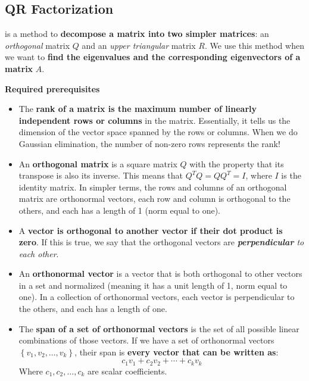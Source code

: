 \subsection{QR Factorization}

 is a method to \textbf{decompose a matrix into two simpler matrices}: an \emph{orthogonal} matrix $Q$ and an \emph{upper triangular} matrix $R$. We use this method when we want to \textbf{find the eigenvalues and the corresponding eigenvectors of a matrix} $A$.

\begin{flushleft}
    \textcolor{Red2}{ \textbf{Required prerequisites}}
\end{flushleft}
\begin{itemize}
    \item The \textbf{rank of a matrix is the maximum number of linearly independent rows or columns} in the matrix. Essentially, it tells us the dimension of the vector space spanned by the rows or columns. When we do Gaussian elimination, the number of non-zero rows represents the rank!
    
    \item An \textbf{orthogonal matrix} is a square matrix $Q$ with the property that its transpose is also its inverse. This means that $Q^{T} Q = Q Q^{T} = I$, where $I$ is the identity matrix. In simpler terms, the rows and columns of an orthogonal matrix are orthonormal vectors, each row and column is orthogonal to the others, and each has a length of 1 (norm equal to one).
    
    \item A \textbf{vector is orthogonal to another vector if their dot product is zero}. If this is true, we say that the orthogonal vectors are \emph{\textbf{perpendicular} to each other}.

    \item An \textbf{orthonormal vector} is a vector that is both orthogonal to other vectors in a set and normalized (meaning it has a unit length of 1, norm equal to one). In a collection of orthonormal vectors, each vector is perpendicular to the others, and each has a length of one.

    \item The \textbf{span of a set of orthonormal vectors} is the set of all possible linear combinations of those vectors. If we have a set of orthonormal vectors $\left\{v_{1}, v_{2}, \dots, v_{k}\right\}$, their span is \textbf{every vector that can be written as}:
    \begin{equation*}
        c_{1}v_{1} + c_{2}v_{2} + \cdots + c_{k}v_{k}
    \end{equation*}
    Where $c_{1}, c_{2}, \dots, c_{k}$ are scalar coefficients.
\end{itemize}

